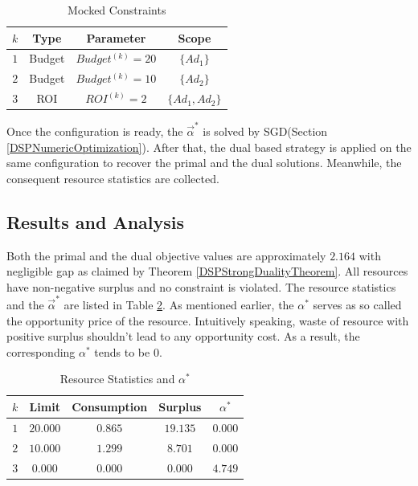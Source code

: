 \documentclass{article}
\newcommand{\valpha}{\vec{\alpha}}
\begin{document}
\begin{table}
\caption{Mocked Constraints\label{TableConstraints}}
\begin{center}
\begin{tabular}{|c|c|c|c|}
\hline
$k$ & Type            & Parameter           & Scope   \\
\hline
$1$ & Budget          & $Budget^{(k)} = 20$ & $\{Ad_1\}$        \\
\hline
$2$ & Budget          & $Budget^{(k)} = 10$ & $\{Ad_2\}$        \\
\hline
$3$ & ROI             & $ROI^{(k)} = 2$     & $\{Ad_1, Ad_2\}$  \\
\hline
\end{tabular}
\end{center}
\end{table}

Once the configuration is ready, the $\valpha^*$ is solved by SGD(Section \ref{DSPNumericOptimization}).
After that, the dual based strategy is applied on the same configuration to recover the primal and the dual solutions.
Meanwhile, the consequent resource statistics are collected.

\subsection{Results and Analysis}

Both the primal and the dual objective values are approximately $2.164$ with negligible gap as claimed by Theorem \ref{DSPStrongDualityTheorem}.
All resources have non-negative surplus and no constraint is violated.
The resource statistics and the $\valpha^*$ are listed in Table \ref{TableStatisticsAndAlpha}.
As mentioned earlier, the $\alpha^*$ serves as so called the opportunity price of the resource.
Intuitively speaking, waste of resource with positive surplus shouldn't lead to any opportunity cost.
As a result, the corresponding $\alpha^*$ tends to be $0$.

\begin{table}
\caption{Resource Statistics and $\alpha^*$\label{TableStatisticsAndAlpha}}
\begin{center}
\begin{tabular}{|c|c|c|c|c|}
\hline
$k$     & Limit    & Consumption & Surplus      & $\alpha^*$ \\
\hline
$1$     & $20.000$ & $0.865$     & $19.135$     & $0.000$ \\
\hline
$2$     & $10.000$ & $1.299$     & $8.701$      & $0.000$ \\
\hline
$3$     & $0.000$  & $0.000$     & $0.000$      & $4.749$ \\
\hline
\end{tabular}
\end{center}
\end{table}
\end{document}
